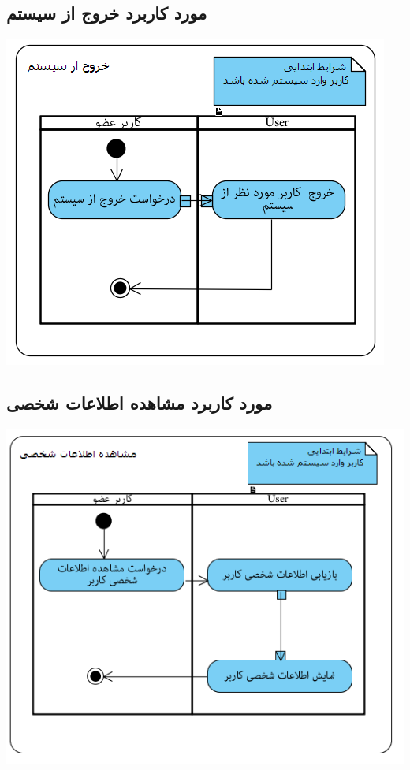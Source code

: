 \newpage
\vspace{2cm}
\subsection*{مورد کاربرد خروج از سیستم}
\vspace{2cm}
\begin{center}
\includegraphics[width=\textwidth]{ActivityDiagramsWithSwimlanes/14.png}
\end{center}

\newpage
\vspace{2cm}
\subsection*{مورد کاربرد مشاهده اطلاعات شخصی}
\vspace{2cm}
\begin{center}
\includegraphics[width=\textwidth]{ActivityDiagramsWithSwimlanes/15.png}
\end{center}


